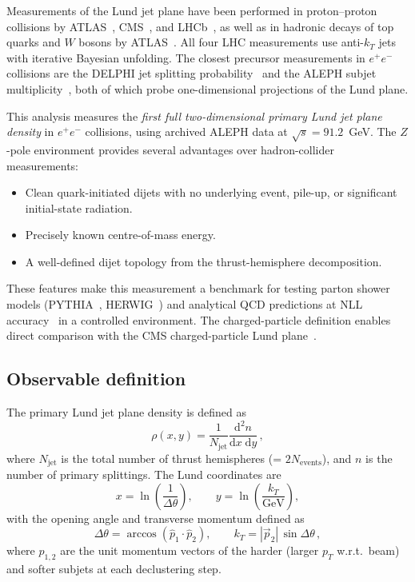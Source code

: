 \documentclass[11pt,a4paper]{article}
\begin{document}
Measurements of the Lund jet plane have been performed in
proton--proton collisions by
ATLAS~\cite{ATLAS:2020bbn},
CMS~\cite{CMS:2024mlf},
and LHCb~\cite{LHCb:2025viq},
as well as in hadronic decays of top quarks and $W$ bosons by
ATLAS~\cite{ATLAS:2024wqo}.
All four LHC measurements use anti-$k_T$ jets with iterative
Bayesian unfolding.  The closest precursor measurements in
$e^+e^-$ collisions are the DELPHI jet splitting
probability~\cite{DELPHI:2003yqh} and the ALEPH subjet
multiplicity~\cite{ALEPH:1998hhp}, both of which probe
one-dimensional projections of the Lund plane.

This analysis measures the \emph{first full two-dimensional primary
Lund jet plane density} in $e^+e^-$ collisions, using archived
ALEPH data at $\sqrt{s} = 91.2$~GeV.  The $Z$-pole environment
provides several advantages over hadron-collider measurements:
\begin{itemize}
\item Clean quark-initiated dijets with no underlying event, pile-up,
  or significant initial-state radiation.
\item Precisely known centre-of-mass energy.
\item A well-defined dijet topology from the thrust-hemisphere
  decomposition.
\end{itemize}
These features make this measurement a benchmark for testing parton
shower models (PYTHIA~\cite{Sjostrand:2014zea,Skands:2014pea},
HERWIG~\cite{Bellm:2015jjp}) and analytical QCD predictions at NLL
accuracy~\cite{Lifson:2020gua} in a controlled environment.  The
charged-particle definition enables direct comparison with the CMS
charged-particle Lund plane~\cite{CMS:2024mlf}.

\subsection{Observable definition}
\label{sec:obs-def}

The primary Lund jet plane density is defined as
\begin{equation}
  \rho(x, y) = \frac{1}{N_\text{jet}}
  \frac{\mathrm{d}^2 n}{\mathrm{d}x\;\mathrm{d}y}\,,
  \label{eq:rho-def}
\end{equation}
where $N_\text{jet}$ is the total number of thrust hemispheres
(= $2 N_\text{events}$), and $n$ is the number of primary
splittings.  The Lund coordinates are
\begin{equation}
  x = \ln\!\left(\frac{1}{\Delta\theta}\right), \qquad
  y = \ln\!\left(\frac{k_T}{\text{GeV}}\right),
  \label{eq:coords}
\end{equation}
with the opening angle and transverse momentum defined as
\begin{equation}
  \Delta\theta = \arccos\!\left(\hat{p}_1 \cdot \hat{p}_2\right),
  \qquad
  k_T = |\vec{p}_2|\,\sin\Delta\theta\,,
  \label{eq:kt-dtheta}
\end{equation}
where $\hat{p}_{1,2}$ are the unit momentum vectors of the harder
(larger $p_T$ w.r.t.\ beam) and softer subjets at each declustering
step.
\end{document}
